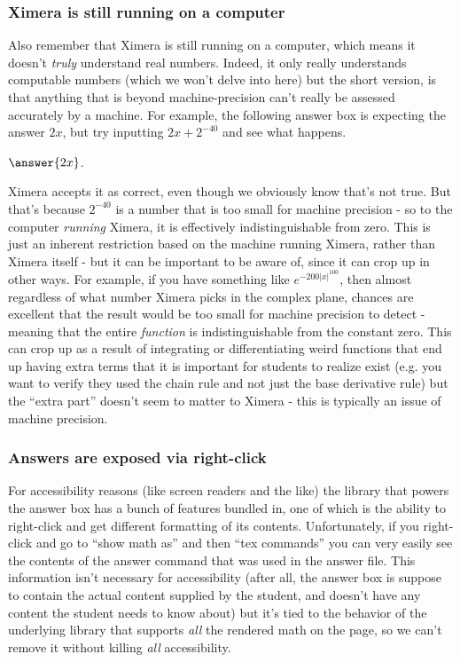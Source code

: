 \documentclass{ximera}
\begin{document}
\subsubsection*{Ximera is still running on a computer}

Also remember that Ximera is still running on a computer, which means it
doesn't \textit{truly} understand real numbers. Indeed, it only really
understands computable numbers (which we won't delve into here) but the short
version, is that anything that is beyond machine-precision can't really be
assessed accurately by a machine. For example, the following answer box is
expecting the answer $2x$, but try inputting $2x+2^{-40}$ and see what happens.
\begin{explanation}
  $\answer{2x}$.
\end{explanation}
Ximera accepts it as correct, even though we obviously know that's not
true. But that's because $2^{-40}$ is a number that is too small for machine
precision - so to the computer \textit{running} Ximera, it is effectively
indistinguishable from zero. This is just an inherent restriction based on the
machine running Ximera, rather than Ximera itself - but it can be important to
be aware of, since it can crop up in other ways. For example, if you have
something like $e^{-200|x|^{100}}$, then almost regardless of what number
Ximera picks in the complex plane, chances are excellent that the result would
be too small for machine precision to detect - meaning that the entire
\textit{function} is indistinguishable from the constant zero. This can crop up
as a result of integrating or differentiating weird functions that end up
having extra terms that it is important for students to realize exist (e.g. you
want to verify they used the chain rule and not just the base derivative rule)
but the ``extra part'' doesn't seem to matter to Ximera - this is typically an
issue of machine precision.

\subsubsection{Answers are exposed via right-click}

For accessibility reasons (like screen readers and the like) the library
that powers the answer box has a bunch of features bundled in, one of which is
the ability to right-click and get different formatting of its contents.
Unfortunately, if you right-click and go to ``show math as'' and then ``tex
commands'' you can very easily see the contents of the answer command that was
used in the answer file. This information isn't necessary for accessibility
(after all, the answer box is suppose to contain the actual content supplied by
the student, and doesn't have any content the student needs to know about) but
it's tied to the behavior of the underlying library that supports \textit{all}
the rendered math on the page, so we can't remove it without killing
\textit{all} accessibility.
\end{document}
